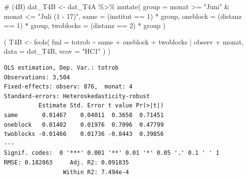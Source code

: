 \documentclass[
  a4paper,
  DIV=11,
  oneside]{scrreprt}
\newenvironment{Shaded}{\begin{snugshade}}{\end{snugshade}}
\newcommand{\AttributeTok}[1]{\textcolor[rgb]{0.40,0.45,0.13}{#1}}
\newcommand{\CommentTok}[1]{\textcolor[rgb]{0.37,0.37,0.37}{#1}}
\newcommand{\DecValTok}[1]{\textcolor[rgb]{0.68,0.00,0.00}{#1}}
\newcommand{\FunctionTok}[1]{\textcolor[rgb]{0.28,0.35,0.67}{#1}}
\newcommand{\NormalTok}[1]{\textcolor[rgb]{0.00,0.23,0.31}{#1}}
\newcommand{\OtherTok}[1]{\textcolor[rgb]{0.00,0.23,0.31}{#1}}
\newcommand{\SpecialCharTok}[1]{\textcolor[rgb]{0.37,0.37,0.37}{#1}}
\newcommand{\StringTok}[1]{\textcolor[rgb]{0.13,0.47,0.30}{#1}}
\begin{document}
\begin{Shaded}
\begin{Highlighting}[]
\CommentTok{\# (4B)}
\NormalTok{dat\_T4B }\OtherTok{\textless{}{-}}\NormalTok{ dat\_T4A }\SpecialCharTok{\%\textgreater{}\%}
  \FunctionTok{mutate}\NormalTok{(}
    \AttributeTok{group =}\NormalTok{ monat }\SpecialCharTok{\textgreater{}=} \StringTok{"Juni"} \SpecialCharTok{\&}\NormalTok{ monat }\SpecialCharTok{\textless{}=} \StringTok{"Juli (1 {-} 17)"}\NormalTok{,}
    \AttributeTok{same =}\NormalTok{ (institut }\SpecialCharTok{==} \DecValTok{1}\NormalTok{) }\SpecialCharTok{*}\NormalTok{ group,}
    \AttributeTok{oneblock =}\NormalTok{ (distanz }\SpecialCharTok{==} \DecValTok{1}\NormalTok{) }\SpecialCharTok{*}\NormalTok{ group,}
    \AttributeTok{twoblocks =}\NormalTok{ (distanz }\SpecialCharTok{==} \DecValTok{2}\NormalTok{) }\SpecialCharTok{*}\NormalTok{ group}
\NormalTok{  ) }

\NormalTok{(}
\NormalTok{  T4B }\OtherTok{\textless{}{-}} \FunctionTok{feols}\NormalTok{(}
    \AttributeTok{fml =}\NormalTok{ totrob }\SpecialCharTok{\textasciitilde{}} 
\NormalTok{      same}
    \SpecialCharTok{+}\NormalTok{ oneblock}
    \SpecialCharTok{+}\NormalTok{ twoblocks }
    \SpecialCharTok{|}\NormalTok{ observ }\SpecialCharTok{+}\NormalTok{ monat, }
    \AttributeTok{data =}\NormalTok{ dat\_T4B, }
    \AttributeTok{vcov =} \StringTok{"HC1"}
\NormalTok{  )}
\NormalTok{)}
\end{Highlighting}
\end{Shaded}

\begin{verbatim}
OLS estimation, Dep. Var.: totrob
Observations: 3,504
Fixed-effects: observ: 876,  monat: 4
Standard-errors: Heteroskedasticity-robust 
          Estimate Std. Error t value Pr(>|t|) 
same       0.01467    0.04011  0.3658  0.71451 
oneblock   0.01402    0.01976  0.7096  0.47799 
twoblocks -0.01466    0.01736 -0.8443  0.39856 
---
Signif. codes:  0 '***' 0.001 '**' 0.01 '*' 0.05 '.' 0.1 ' ' 1
RMSE: 0.182863     Adj. R2: 0.091835
                 Within R2: 7.494e-4
\end{verbatim}
\end{document}
